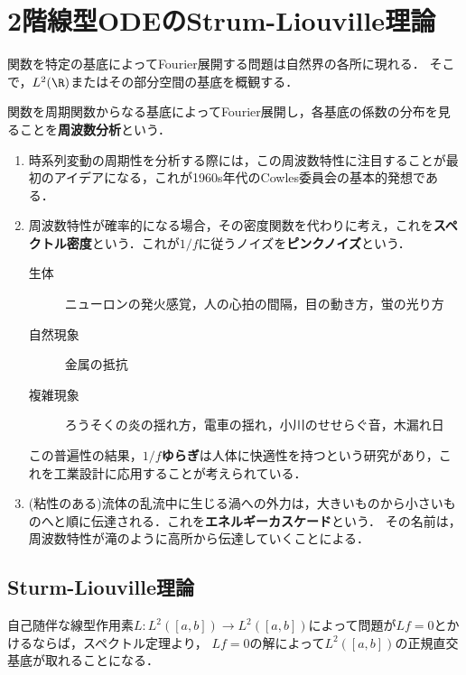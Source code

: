 \documentclass[uplatex,dvipdfmx]{jsreport}
\begin{document}
\section{2階線型ODEのStrum-Liouville理論}

\begin{tcolorbox}[colframe=ForestGreen, colback=ForestGreen!10!white,breakable,colbacktitle=ForestGreen!40!white,coltitle=black,fonttitle=\bfseries\sffamily,
title=]
    関数を特定の基底によってFourier展開する問題は自然界の各所に現れる．
    そこで，$L^2(\R)$またはその部分空間の基底を概観する．
\end{tcolorbox}

\begin{application}
    関数を周期関数からなる基底によってFourier展開し，各基底の係数の分布を見ることを\textbf{周波数分析}という．
    \begin{enumerate}
        \item 時系列変動の周期性を分析する際には，この周波数特性に注目することが最初のアイデアになる，これが1960s年代のCowles委員会の基本的発想である．
        \item 周波数特性が確率的になる場合，その密度関数を代わりに考え，これを\textbf{スペクトル密度}という．これが$1/f$に従うノイズを\textbf{ピンクノイズ}という．
        \begin{description}
            \item[生体] ニューロンの発火感覚，人の心拍の間隔，目の動き方，蛍の光り方
            \item[自然現象] 金属の抵抗
            \item[複雑現象] ろうそくの炎の揺れ方，電車の揺れ，小川のせせらぐ音，木漏れ日
        \end{description}
        この普遍性の結果，\textbf{$1/f$ゆらぎ}は人体に快適性を持つという研究があり，これを工業設計に応用することが考えられている．
        \item (粘性のある)流体の乱流中に生じる渦への外力は，大きいものから小さいものへと順に伝達される．これを\textbf{エネルギーカスケード}という．
        その名前は，周波数特性が滝のように高所から伝達していくことによる．
    \end{enumerate}
\end{application}

\subsection{Sturm-Liouville理論}

\begin{tcolorbox}[colframe=ForestGreen, colback=ForestGreen!10!white,breakable,colbacktitle=ForestGreen!40!white,coltitle=black,fonttitle=\bfseries\sffamily,
title=]
    自己随伴な線型作用素$L:L^2([a,b])\to L^2([a,b])$によって問題が$Lf=0$とかけるならば，スペクトル定理より，
    $Lf=0$の解によって$L^2([a,b])$の正規直交基底が取れることになる．
\end{tcolorbox}
\end{document}

